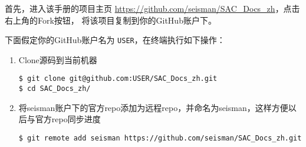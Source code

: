 首先，进入该手册的项目主页 \url{https://github.com/seisman/SAC_Docs_zh}，点击右上角的Fork按钮，
将该项目复制到你的GitHub账户下。

下面假定你的GitHub账户名为 \texttt{USER}，在终端执行如下操作：
\begin{enumerate}
\item Clone源码到当前机器
\begin{verbatim}
$ git clone git@github.com:USER/SAC_Docs_zh.git
$ cd SAC_Docs_zh/
\end{verbatim}
\item 将seisman账户下的官方repo添加为远程repo，并命名为seisman，这样方便以后与官方repo同步进度
\begin{verbatim}
$ git remote add seisman https://github.com/seisman/SAC_Docs_zh.git
\end{verbatim}
\end{enumerate}

